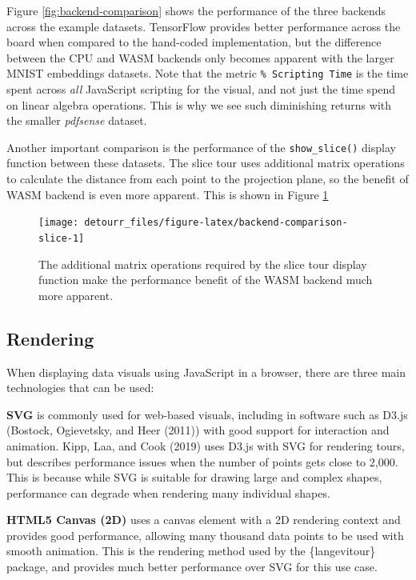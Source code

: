 Figure \ref{fig:backend-comparison} shows the performance of the three backends across the example datasets. TensorFlow provides better performance across the board when compared to the hand-coded implementation, but the difference between the CPU and WASM backends only becomes apparent with the larger MNIST embeddings datasets. Note that the metric \texttt{\%\ Scripting\ Time} is the time spent across \emph{all} JavaScript scripting for the visual, and not just the time spend on linear algebra operations. This is why we see such diminishing returns with the smaller \emph{pdfsense} dataset.

Another important comparison is the performance of the \texttt{show\_slice()} display function between these datasets. The slice tour uses additional matrix operations to calculate the distance from each point to the projection plane, so the benefit of WASM backend is even more apparent. This is shown in Figure \ref{fig:backend-comparison-slice}

\begin{figure}
\texttt{[image: detourr\_files/figure-latex/backend-comparison-slice-1]} \caption{The additional matrix operations required by the slice tour display function make the performance benefit of the WASM backend much more apparent.}\label{fig:backend-comparison-slice}
\end{figure}

\hypertarget{rendering}{%
\subsection{Rendering}\label{rendering}}

When displaying data visuals using JavaScript in a browser, there are three main technologies that can be used:

\textbf{SVG} is commonly used for web-based visuals, including in software such as D3.js (Bostock, Ogievetsky, and Heer (2011)) with good support for interaction and animation. Kipp, Laa, and Cook (2019) uses D3.js with SVG for rendering tours, but describes performance issues when the number of points gets close to 2,000. This is because while SVG is suitable for drawing large and complex shapes, performance can degrade when rendering many individual shapes.

\textbf{HTML5 Canvas (2D)} uses a canvas element with a 2D rendering context and provides good performance, allowing many thousand data points to be used with smooth animation. This is the rendering method used by the \{langevitour\} package, and provides much better performance over SVG for this use case.

